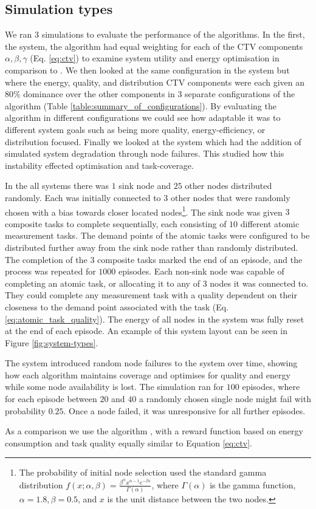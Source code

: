 \subsection{Simulation types}
We ran $3$ simulations to evaluate the performance of the algorithms. In the first, the \simulationSimple{}{} system,  the \acronymWSNOptimisation{}{} algorithm had
equal weighting for each of the CTV components $\alpha, \beta, \gamma$ (Eq. \ref{eq:ctv}) to examine system utility and energy optimisation in comparison to \acronymQRouting{}{}.  We then looked at the same configuration in the \simulationExtended{}{} system but where the energy, quality, and distribution CTV components were each given an $80\%$ dominance over the other components in $3$ separate configurations of the algorithm (Table \ref{table:summary_of_configurations}). By evaluating the algorithm in different configurations we could see how adaptable it was to different system goals such as being more quality, energy-efficiency, or distribution focused. Finally we looked at the \simulationNodeFailure{}{} system which had the addition of simulated system degradation through node failures. This studied how this instability effected optimisation and task-coverage.  

In the all systems there was  $1$ sink node and $25$ other nodes distributed randomly. Each was initially connected to $3$ other nodes that were randomly chosen with a bias towards closer located nodes\footnote{
		The probability of initial node selection used the standard gamma distribution $f(x; \alpha, \beta) = \frac{\beta^{\alpha} x^{\alpha-1}e^{- \beta x}}   {\Gamma(\alpha)}$, where $\Gamma(\alpha)$ is the  gamma function, $\alpha=1.8, \beta=0.5$, and $x$ is the unit distance between the two nodes.
	}. 
The sink node was given $3$ composite tasks to complete sequentially, each consisting of $10$ different atomic measurement tasks. The demand points of the atomic tasks were configured to be distributed further away from the sink node rather than randomly distributed. The completion of the $3$ composite tasks marked the end of an episode, and the process was repeated for $1000$ episodes. Each non-sink node was capable of completing an atomic task, or allocating it to any of $3$ nodes it was connected to. They could complete any measurement task with a quality dependent on their closeness to the demand point associated with the task (Eq. \ref{eq:atomic_task_quality}). The energy of all nodes in the system was fully reset at the end of each episode. An example of this system layout can be seen in Figure \ref{fig:system-types}. 

The \simulationNodeFailure{}{} system introduced random node failures to the system over time, showing how each algorithm maintains coverage and optimises for quality and energy while some node availability is lost. The simulation ran for $100$ episodes, where for each episode between $20$ and $40$  a randomly chosen single node might fail with probability $0.25$. Once a node failed, it was unresponsive for all further episodes. 

As a comparison we use the \acronymQRouting{}{} algorithm \citep{Boyan}, with a reward function based on energy consumption and task quality equally similar to Equation \ref{eq:ctv}.

 

